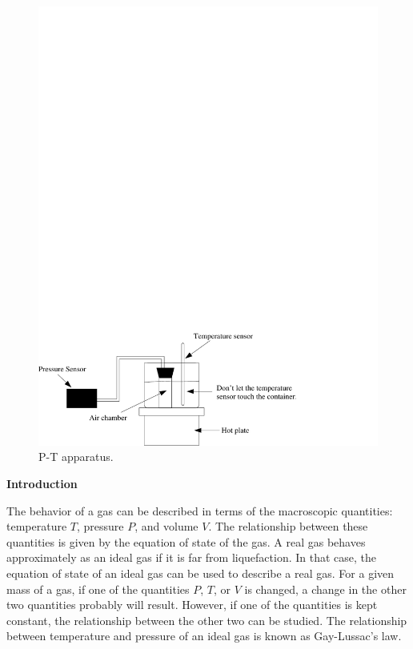 \begin{figure}[hbt]
\begin{center}
\includegraphics[width=6.0in]{P-T_relationship_of_gas/P-T_fig1b.pdf}
\caption{P-T apparatus.}
\end{center}
\end{figure}

\textbf{Introduction}

The behavior of a gas can be described in terms of the macroscopic quantities:
temperature $T$, pressure $P$, and volume $V$. The relationship between these
quantities is given by the equation of state of the gas. A real gas behaves
approximately as an ideal gas if it is far from liquefaction. In that case,
the equation of state of an ideal gas can be used to describe a real gas. For
a given mass of a gas, if one of the quantities $P$, $T$, or $V$ is changed, a change
in the other two quantities probably will result. However, if one of the 
quantities is kept constant, the relationship between the other two can be 
studied. The relationship between temperature and pressure of an ideal gas is 
known as Gay-Lussac's law.

